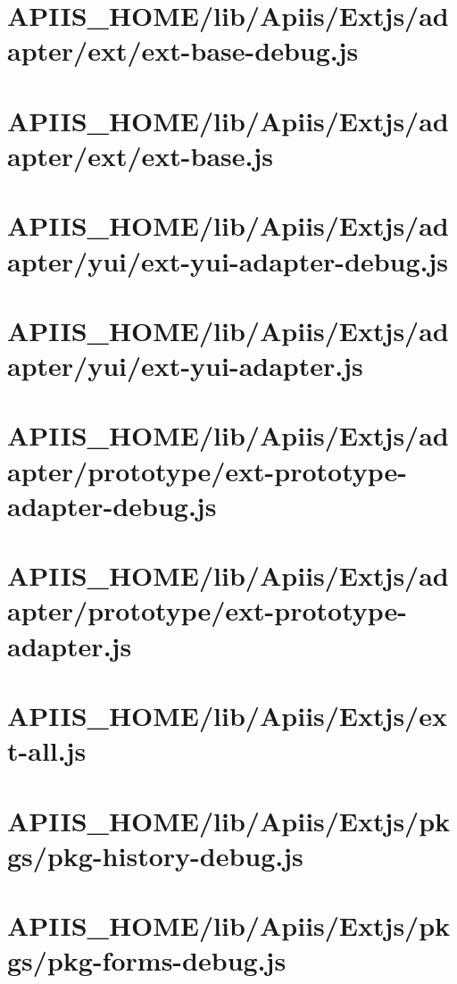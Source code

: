 \section{APIIS\_HOME/lib/Apiis/Extjs/adapter/ext/ext-base-debug.js} 
\section{APIIS\_HOME/lib/Apiis/Extjs/adapter/ext/ext-base.js} 
\section{APIIS\_HOME/lib/Apiis/Extjs/adapter/yui/ext-yui-adapter-debug.js} 
\section{APIIS\_HOME/lib/Apiis/Extjs/adapter/yui/ext-yui-adapter.js} 
\section{APIIS\_HOME/lib/Apiis/Extjs/adapter/prototype/ext-prototype-adapter-debug.js} 
\section{APIIS\_HOME/lib/Apiis/Extjs/adapter/prototype/ext-prototype-adapter.js} 
\section{APIIS\_HOME/lib/Apiis/Extjs/ext-all.js} 
\section{APIIS\_HOME/lib/Apiis/Extjs/pkgs/pkg-history-debug.js} 
\section{APIIS\_HOME/lib/Apiis/Extjs/pkgs/pkg-forms-debug.js} 

